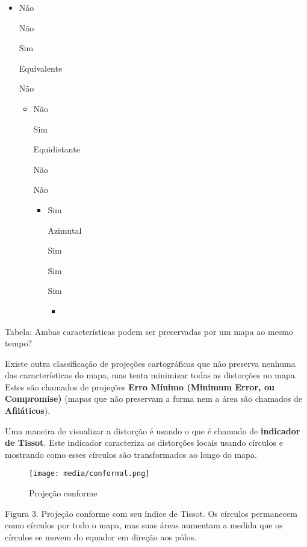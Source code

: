\documentclass[
]{book}
\providecommand{\tightlist}{%
  \setlength{\itemsep}{0pt}\setlength{\parskip}{0pt}}
\theoremstyle{definition}
\theoremstyle{definition}
\theoremstyle{definition}
\theoremstyle{definition}
\theoremstyle{remark}
\begin{document}
\begin{itemize}
\item
  Não

  Não

  Sim

  Equivalente

  Não

  \begin{itemize}
  \item
    Não

    Sim

    Equidistante

    Não

    Não

    \begin{itemize}
    \item
      Sim

      Azimutal

      Sim

      Sim

      Sim

      \begin{itemize}
      \tightlist
      \item
      \end{itemize}
    \end{itemize}
  \end{itemize}
\end{itemize}

Tabela: Ambas características podem ser preservadas por um mapa ao mesmo tempo?

Existe outra classificação de projeções cartográficas que não preserva nenhuma das características do mapa, mas tenta minimizar todas as distorções no mapa. Estes são chamados de projeções \textbf{Erro Mínimo (Minimum Error, ou Compromise)} (mapas que não preservam a forma nem a área são chamados de \textbf{Afiláticos}).

Uma maneira de visualizar a distorção é usando o que é chamado de \textbf{indicador de Tissot}. Este indicador caracteriza as distorções locais usando círculos e mostrando como esses círculos são transformados ao longo do mapa.

\begin{figure}
\centering
\texttt{[image: media/conformal.png]}
\caption{Projeção conforme}
\end{figure}

Figura 3. Projeção conforme com seu índice de Tissot. Os círculos permanecem como círculos por todo o mapa, mas suas áreas aumentam a medida que os círculos se movem do equador em direção aos pólos.
\end{document}
